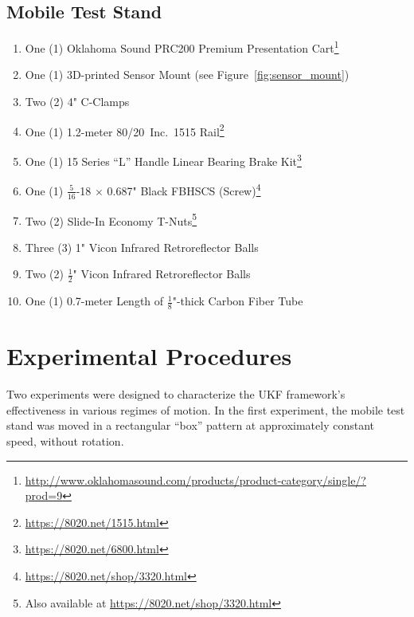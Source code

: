 \subsection{Mobile Test Stand}
\begin{enumerate}
\item One (1) Oklahoma Sound PRC200 Premium Presentation Cart\footnote{\url{http://www.oklahomasound.com/products/product-category/single/?prod=9}}
\item One (1) 3D-printed Sensor Mount (see Figure~\ref{fig:sensor_mount})
\item Two (2) 4" C-Clamps
\item One (1) 1.2-meter 80/20\textsuperscript{\textregistered}~Inc.\ 1515 Rail\footnote{\url{https://8020.net/1515.html}}
\item One (1) 15 Series ``L'' Handle Linear Bearing Brake Kit\footnote{\url{https://8020.net/6800.html}}
\item One (1) $\frac{5}{16}$-18 $\times$ 0.687" Black FBHSCS (Screw)\footnote{\url{https://8020.net/shop/3320.html}}
\item Two (2) Slide-In Economy T-Nuts\footnote{Also available at \url{https://8020.net/shop/3320.html}}
\item Three (3) 1" Vicon Infrared Retroreflector Balls
\item Two (2) $\frac{1}{2}$" Vicon Infrared Retroreflector Balls
\item One (1) 0.7-meter Length of $\frac{1}{8}$"-thick Carbon Fiber Tube
\end{enumerate}

\section{Experimental Procedures}

Two experiments were designed to characterize the UKF framework's effectiveness in various regimes of motion. In the first experiment, the mobile test stand was moved in a rectangular ``box'' pattern at approximately constant speed, without rotation.

